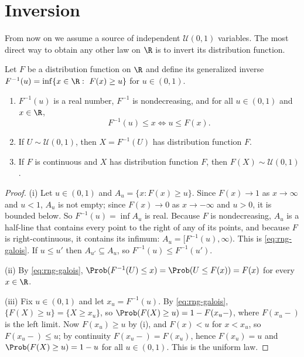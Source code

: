 \section{Inversion}\label{sec:rng-inversion}

From now on we assume a source of independent $\mathcal U(0,1)$ variables. The most
direct way to obtain any other law on $\R$ is to invert its distribution function.

\begin{proposition}[Inversion]\label{prop:rng-inversion}
Let $F$ be a distribution function on $\R$ and define its generalized inverse
$F^{-1}(u)=\inf\{x\in\R:\ F(x)\ge u\}$ for $u\in(0,1)$.
\begin{enumerate}[label=(\roman*)]
  \item $F^{-1}(u)$ is a real number, $F^{-1}$ is nondecreasing, and for all $u\in(0,1)$
    and $x\in\R$,
    \begin{equation}\label{eq:rng-galois}
      F^{-1}(u)\le x\iff u\le F(x).
    \end{equation}
  \item If $U\sim\mathcal U(0,1)$, then $X=F^{-1}(U)$ has distribution function $F$.
  \item If $F$ is continuous and $X$ has distribution function $F$, then $F(X)\sim\mathcal U(0,1)$.
\end{enumerate}
\end{proposition}

\begin{proof}
(i) Let $u\in(0,1)$ and $A_u=\{x:F(x)\ge u\}$. Since $F(x)\to1$ as $x\to\infty$ and
$u<1$, $A_u$ is not empty; since $F(x)\to0$ as $x\to-\infty$ and $u>0$, it is bounded
below. So $F^{-1}(u)=\inf A_u$ is real. Because $F$ is nondecreasing, $A_u$ is a half-line
that contains every point to the right of any of its points, and because $F$ is
right-continuous, it contains its infimum: $A_u=[F^{-1}(u),\infty)$. This is
\eqref{eq:rng-galois}. If $u\le u'$ then $A_{u'}\subseteq A_u$, so $F^{-1}(u)\le F^{-1}(u')$.

(ii) By \eqref{eq:rng-galois}, $\Prob(F^{-1}(U)\le x)=\Prob(U\le F(x))=F(x)$ for every
$x\in\R$.

(iii) Fix $u\in(0,1)$ and let $x_u=F^{-1}(u)$. By \eqref{eq:rng-galois},
$\{F(X)\ge u\}=\{X\ge x_u\}$, so $\Prob(F(X)\ge u)=1-F(x_u-)$, where $F(x_u-)$ is the left
limit. Now $F(x_u)\ge u$ by (i), and $F(x)<u$ for $x<x_u$, so $F(x_u-)\le u$; by continuity
$F(x_u-)=F(x_u)$, hence $F(x_u)=u$ and $\Prob(F(X)\ge u)=1-u$ for all $u\in(0,1)$. This is
the uniform law.
\end{proof}

